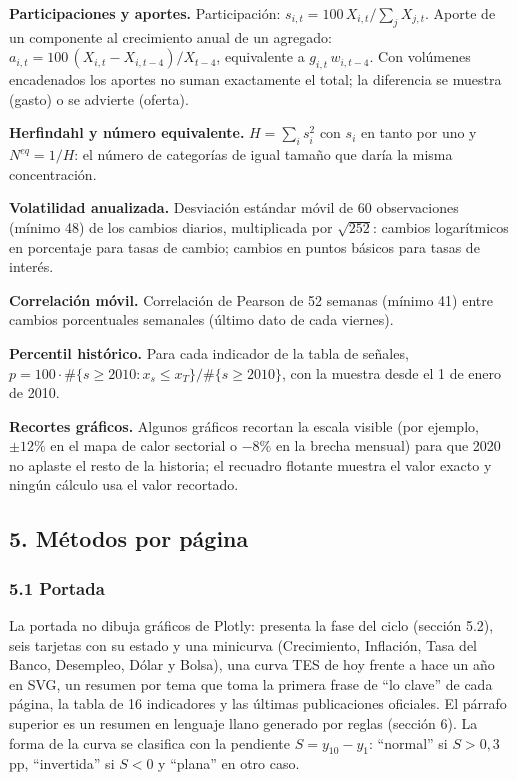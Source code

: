 \textbf{Participaciones y aportes.} Participación:
\(s_{i,t} = 100\,X_{i,t}/\sum_j X_{j,t}\). Aporte de un componente al
crecimiento anual de un agregado:
\(a_{i,t} = 100\,(X_{i,t}-X_{i,t-4})/X_{t-4}\), equivalente a
\(g_{i,t}\,w_{i,t-4}\). Con volúmenes encadenados los aportes no suman
exactamente el total; la diferencia se muestra (gasto) o se advierte
(oferta).

\textbf{Herfindahl y número equivalente.} \(H=\sum_i s_i^2\) con \(s_i\)
en tanto por uno y \(N^{eq}=1/H\): el número de categorías de igual
tamaño que daría la misma concentración.

\textbf{Volatilidad anualizada.} Desviación estándar móvil de 60
observaciones (mínimo 48) de los cambios diarios, multiplicada por
\(\sqrt{252}\): cambios logarítmicos en porcentaje para tasas de cambio;
cambios en puntos básicos para tasas de interés.

\textbf{Correlación móvil.} Correlación de Pearson de 52 semanas (mínimo
41) entre cambios porcentuales semanales (último dato de cada viernes).

\textbf{Percentil histórico.} Para cada indicador de la tabla de
señales, \(p = 100\cdot\#\{s\ge 2010: x_s \le x_T\}/\#\{s\ge 2010\}\),
con la muestra desde el 1 de enero de 2010.

\textbf{Recortes gráficos.} Algunos gráficos recortan la escala visible
(por ejemplo, \(\pm 12\%\) en el mapa de calor sectorial o \(-8\%\) en
la brecha mensual) para que 2020 no aplaste el resto de la historia; el
recuadro flotante muestra el valor exacto y ningún cálculo usa el valor
recortado.

\hypertarget{muxe9todos-por-puxe1gina}{%
\subsection{5. Métodos por página}\label{muxe9todos-por-puxe1gina}}

\hypertarget{portada}{%
\subsubsection{5.1 Portada}\label{portada}}

La portada no dibuja gráficos de Plotly: presenta la fase del ciclo
(sección 5.2), seis tarjetas con su estado y una minicurva (Crecimiento,
Inflación, Tasa del Banco, Desempleo, Dólar y Bolsa), una curva TES de
hoy frente a hace un año en SVG, un resumen por tema que toma la primera
frase de ``lo clave'' de cada página, la tabla de 16 indicadores y las
últimas publicaciones oficiales. El párrafo superior es un resumen en
lenguaje llano generado por reglas (sección 6). La forma de la curva se
clasifica con la pendiente \(S=y_{10}-y_{1}\): ``normal'' si \(S>0{,}3\)
pp, ``invertida'' si \(S<0\) y ``plana'' en otro caso.


